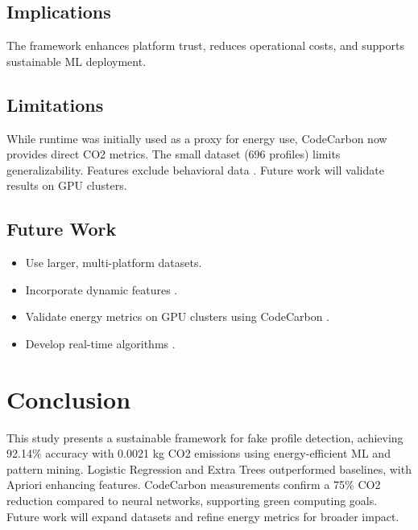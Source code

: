 \documentclass[conference]{IEEEtran}
\begin{document}
\subsection{Implications}
The framework enhances platform trust, reduces operational costs, and supports sustainable ML deployment.

\subsection{Limitations}
While runtime was initially used as a proxy for energy use, CodeCarbon now provides direct CO2 metrics. The small dataset (696 profiles) limits generalizability. Features exclude behavioral data \cite{b12}. Future work will validate results on GPU clusters.

\subsection{Future Work}
\begin{itemize}
    \item Use larger, multi-platform datasets.
    \item Incorporate dynamic features \cite{b12}.
    \item Validate energy metrics on GPU clusters using CodeCarbon \cite{b13}.
    \item Develop real-time algorithms \cite{b14}.
\end{itemize}

\section{Conclusion}
\label{sec:conclude}
This study presents a sustainable framework for fake profile detection, achieving 92.14\% accuracy with 0.0021 kg CO2 emissions using energy-efficient ML and pattern mining. Logistic Regression and Extra Trees outperformed baselines, with Apriori enhancing features. CodeCarbon measurements confirm a 75\% CO2 reduction compared to neural networks, supporting green computing goals. Future work will expand datasets and refine energy metrics for broader impact.
\end{document}
